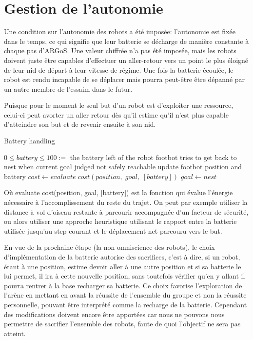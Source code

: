 \section{Gestion de l'autonomie}
Une condition sur l'autonomie des robots a été imposée: l'autonomie est fixée dans le temps, ce qui signifie que leur batterie se décharge de manière constante à chaque pas d'ARGoS. Une valeur chiffrée n'a pas été imposée, mais les robots doivent juste être capables d'effectuer un aller-retour vers un point le plus éloigné de leur nid de départ à leur vitesse de régime. Une fois la batterie écoulée, le robot est rendu incapable de se déplacer mais pourra peut-être être dépanné par un autre membre de l'essaim dans le futur.

Puisque pour le moment le seul but d'un robot est d'exploiter une ressource, celui-ci peut avorter un aller retour dès qu'il estime qu'il n'est plus capable d'atteindre son but et de revenir ensuite à son nid.

\begin{algorithm}                    
\caption{Battery handling}
\label{algo:batterie}
\begin{algorithmic}[1]
  \REQUIRE \(0 \leq battery \leq 100 :=\) the battery left of the robot
  \ENSURE footbot tries to get back to nest when current goal judged not safely reachable
    \STATE update footbot position and battery
    \STATE \(cost \leftarrow evaluate\;cost(position,\;goal,\;[battery])\) 
      \STATE \(goal \leftarrow nest\) 
    \ENDIF
  \ENDWHILE
\end{algorithmic}
\end{algorithm}
Où evaluate cost(position, goal, [battery]) est la fonction qui évalue l'énergie nécessaire à l'accomplissement du reste du trajet. On peut par exemple utiliser la distance à vol d'oiseau restante à parcourir accompagnée d'un facteur de sécurité, ou alors utiliser une approche heuristique utilisant le rapport entre la batterie utilisée jusqu'au step courant et le déplacement net parcouru vers le but.

En vue de la prochaine étape (la non omniscience des robots), le choix d'implémentation de la batterie autorise des sacrifices, c'est à dire, si un robot, étant à une position, estime devoir aller à une autre position et si sa batterie le lui permet, il ira à cette nouvelle position, sans toutefois vérifier qu'en y allant il pourra rentrer à la base recharger sa batterie. Ce choix favorise l'exploration de l'arène en mettant en avant la réussite de l'ensemble du groupe et non la réussite personnelle, pouvant être interprété comme la recharge de la batterie. Cependant des modifications doivent encore être apportées car nous ne pouvons nous permettre de sacrifier l'ensemble des robots, faute de quoi l'objectif ne sera pas atteint.